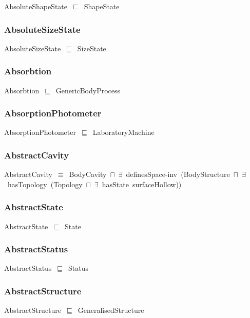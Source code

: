 \documentclass{article}
\begin{document}
AbsoluteShapeState~\ensuremath{\sqsubseteq}~ShapeState~

\subsubsection*{AbsoluteSizeState}

AbsoluteSizeState~\ensuremath{\sqsubseteq}~SizeState~

\subsubsection*{Absorbtion}

Absorbtion~\ensuremath{\sqsubseteq}~GenericBodyProcess~

\subsubsection*{AbsorptionPhotometer}

AbsorptionPhotometer~\ensuremath{\sqsubseteq}~LaboratoryMachine~

\subsubsection*{AbstractCavity}

AbstractCavity~\ensuremath{\equiv}~BodyCavity~\ensuremath{\sqcap}~\ensuremath{\exists}~definesSpace-inv~(BodyStructure~\ensuremath{\sqcap}~\ensuremath{\exists}~hasTopology~(Topology~\ensuremath{\sqcap}~\ensuremath{\exists}~hasState~surfaceHollow))

\subsubsection*{AbstractState}

AbstractState~\ensuremath{\sqsubseteq}~State~

\subsubsection*{AbstractStatus}

AbstractStatus~\ensuremath{\sqsubseteq}~Status~

\subsubsection*{AbstractStructure}

AbstractStructure~\ensuremath{\sqsubseteq}~GeneralisedStructure~
\end{document}
